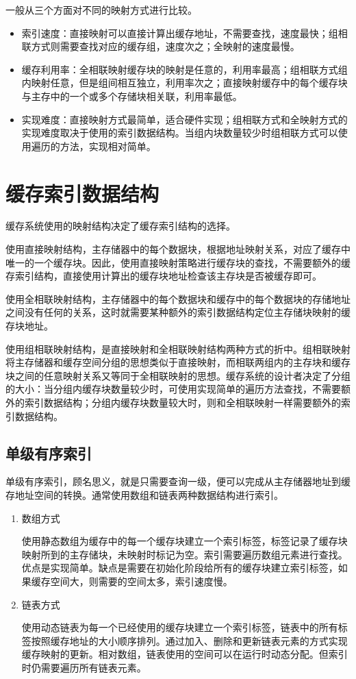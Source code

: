 一般从三个方面对不同的映射方式进行比较。
\begin{itemize}
\item 索引速度：直接映射可以直接计算出缓存地址，不需要查找，速度最快；组相联方式则需要查找对应的缓存组，速度次之；全映射的速度最慢。
\item
缓存利用率：全相联映射缓存块的映射是任意的，利用率最高；组相联方式组内映射任意，但是组间相互独立，利用率次之；直接映射缓存中的每个缓存块与主存中的一个或多个存储块相关联，利用率最低。
\item
实现难度：直接映射方式最简单，适合硬件实现；组相联方式和全映射方式的实现难度取决于使用的索引数据结构。当组内块数量较少时组相联方式可以使用遍历的方法，实现相对简单。
\end{itemize}

\section{缓存索引数据结构}
\label{sec:cache_indexing}

缓存系统使用的映射结构决定了缓存索引结构的选择。

使用直接映射结构，主存储器中的每个数据块，根据地址映射关系，对应了缓存中唯一的一个缓存块。因此，使用直接映射策略进行缓存块的查找，不需要额外的缓存索引结构，直接使用计算出的缓存块地址检查该主存块是否被缓存即可。

使用全相联映射结构，主存储器中的每个数据块和缓存中的每个数据块的存储地址之间没有任何的关系，这时就需要某种额外的索引数据结构定位主存储块映射的缓存块地址。

使用组相联映射结构，是直接映射和全相联映射结构两种方式的折中。组相联映射将主存储器和缓存空间分组的思想类似于直接映射，而相联两组内的主存块和缓存块之间的任意映射关系又等同于全相联映射的思想。缓存系统的设计者决定了分组的大小：当分组内缓存块数量较少时，可使用实现简单的遍历方法查找，不需要额外的索引数据结构；分组内缓存块数量较大时，则和全相联映射一样需要额外的索引数据结构。

\subsection{单级有序索引}
单级有序索引，顾名思义，就是只需要查询一级，便可以完成从主存储器地址到缓存地址空间的转换。通常使用数组和链表两种数据结构进行索引。

\begin{enumerate}
\item 数组方式

使用静态数组为缓存中的每一个缓存块建立一个索引标签，标签记录了缓存块映射所到的主存储块，未映射时标记为空。索引需要遍历数组元素进行查找。优点是实现简单。缺点是需要在初始化阶段给所有的缓存块建立索引标签，如果缓存空间大，则需要的空间太多，索引速度慢。
\item 链表方式

使用动态链表为每一个已经使用的缓存块建立一个索引标签，链表中的所有标签按照缓存地址的大小顺序排列。通过加入、删除和更新链表元素的方式实现缓存映射的更新。相对数组，链表使用的空间可以在运行时动态分配。但索引时仍需要遍历所有链表元素。
\end{enumerate}

